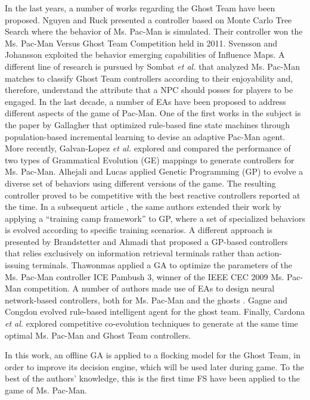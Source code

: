 \documentclass{llncs}
\begin{document}
In the last years, a number of works regarding the Ghost Team have been proposed. Nguyen and Ruck \cite{Nguyen2011,Nguyen2013} presented a controller based on Monte Carlo Tree Search where the behavior of Ms. Pac-Man is simulated. Their controller won the Ms. Pac-Man Versus Ghost Team Competition held in 2011. Svensson and Johansson \cite{Svensson2012} exploited the behavior emerging capabilities of Influence Maps. A different line of research is pursued by Sombat \textit{et al.} \cite{Sombat2012} that analyzed Ms. Pac-Man matches to classify Ghost Team controllers according to their enjoyability and, therefore, understand the attribute that a NPC should posses for players to be engaged. 
In the last decade, a number of EAs have been proposed to address different aspects of the game of Pac-Man. One of the first works in the subject is the paper by Gallagher \cite{Gallagher03} that optimized rule-based fine state machines through population-based incremental learning to devise an adaptive Pac-Man agent. More recently, Galvan-Lopez \textit{et al.} \cite{Galvan-Lopez10} explored and compared the performance of two types of Grammatical Evolution (GE) mappings to generate controllers for Ms. Pac-Man. Alhejali and Lucas \cite{Alhejali10} applied Genetic Programming (GP) to evolve a diverse set of behaviors using different versions of the game. The resulting controller proved to be competitive with the best reactive controllers reported at the time. In a subsequent article \cite{AlhejaliLucas11}, the same authors extended their work by applying a ``training camp framework'' to GP, where a set of specialized behaviors is evolved according to specific training scenarios. A different approach is presented by Brandstetter and Ahmadi \cite{Brandstetter12} that proposed a GP-based controllers that relies exclusively on information retrieval terminals rather than action-issuing terminals.  Thawonmas \cite{Thawonmas10} applied a GA to optimize the parameters of the Ms. Pac-Man controller ICE Pambush 3, winner of the IEEE CEC 2009 Ms. Pac-Man competition. A number of authors made use of EAs to design neural network-based controllers, both for Ms. Pac-Man \cite{Lucas05,Burrow09} and the ghosts \cite{Jia-Yue11}. Gagne and Congdon \cite{Gagne2012} evolved rule-based intelligent agent for the ghost team. Finally, Cardona \textit{et al.} \cite{Cardona13} explored competitive co-evolution techniques to generate at the same time optimal Ms. Pac-Man and Ghost Team controllers.

In this work, an offline GA is applied to a flocking model for the Ghost Team, in order to improve its decision engine, which will be used later during game. To the best of the authors' knowledge, this is the first time FS have been applied to the game of Ms. Pac-Man.
\end{document}
